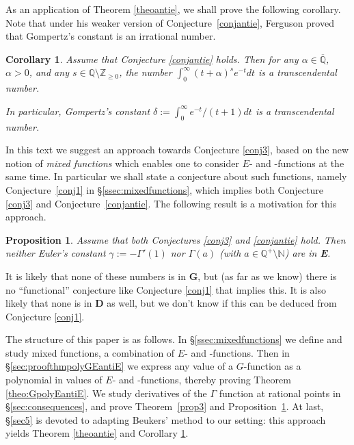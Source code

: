 \documentclass[reqno,12pt]{article}
\numberwithin{equation}{section}
\newtheorem{coro}{Corollary}
\newtheorem{prop}{Proposition}
\theoremstyle{remark}
\newcommand{\Qbar}{\overline{\mathbb Q}}
\newcommand{\tantie}{\foreignlanguage{russian}{\CYREREV}}
\newcommand{\antie}{\text{\tantie}}
\begin{document}
As an application of Theorem \ref{theoantie}, we shall prove the following corollary. Note that under his weaker version of Conjecture~\ref{conjantie}, Ferguson \cite[p.~171, Theorem 2]{ferguson} proved that Gompertz's constant is an irrational number.

\begin{coro} \label{coro:0701} 
Assume that Conjecture \ref{conjantie} holds. Then for any $\alpha\in \Qbar$, $\alpha>0$, and any $s\in \mathbb Q \setminus \mathbb Z_{\ge 0}$, the number $\int_0^\infty (t+\alpha)^s e^{-t}dt$ is a transcendental number.

In particular, Gompertz's constant $\delta:=\int_0^\infty e^{-t}/(t+1) dt$ is a transcendental number.
\end{coro}

In this text we suggest an approach towards Conjecture \ref{conj3}, based on the new notion of {\em mixed functions} which enables one to consider $E$- and \tantie-functions at the same time. In particular we shall state a conjecture about such functions, namely Conjecture~\ref{conj1} in \S\ref{ssec:mixedfunctions}, which implies both Conjecture \ref{conj3} and Conjecture~\ref{conjantie}. The following result is a motivation for this approach.

\begin{prop}\label{proppasdansE}
 Assume that both Conjectures \ref{conj3} and \ref{conjantie} hold. Then 
neither Euler's constant $\gamma:=-\Gamma'(1)$ nor $\Gamma(a)$ (with $a\in \mathbb Q^+\setminus \mathbb N$) are in {\bf E}.
\end{prop}

It is likely that none of these numbers   is  in {\bf G}, but (as far as we know) there is no ``functional'' conjecture like Conjecture \ref{conj1} that implies this. It is also likely that none is in  {\bf D} as well, but we don't know if this can be deduced from Conjecture \ref{conj1}.


\bigskip

The structure of this paper is as follows. In \S \ref{ssec:mixedfunctions} we define and study mixed functions, a combination of $E$- and \antie-functions. Then in \S \ref{sec:proofthmpolyGEantiE} we express any value of  a $G$-function as a polynomial in values of $E$- and \antie-functions, thereby proving Theorem \ref{theo:GpolyEantiE}.
We study derivatives of the $\Gamma $ function at rational points  in \S \ref{sec:consequences}, and prove  Theorem~\ref{prop3} and Proposition~\ref{proppasdansE}. At last, \S \ref{sec5} is devoted to adapting  Beukers' method to our setting: this approach yields  Theorem \ref{theoantie} and Corollary \ref{coro:0701}.
\end{document}
